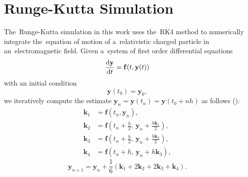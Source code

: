 	\section{Runge-Kutta Simulation}
	\label{sec:rks}
		The~Runge-Kutta simulation in this work uses the~\ac{RK4} method to numerically integrate the~equation of motion of a~relativistic charged particle in an~electromagnetic field. Given a~system of first order differential equations
			\begin{equation}
				\derivative{\mathbf{y}}{t}(t) = \mathbf{f}(t,\mathbf{y}(t))
			\end{equation}
		with an initial condition
			\begin{equation}
				\mathbf{y}(t_0) = \mathbf{y}_0,
			\end{equation}
		we iteratively compute the estimate $\mathbf{y}_n = \mathbf{y}(t_n) = \mathbf{y}(t_0+nh)$ as follows ():
			\begin{align}
				\mathbf{k}_1 &= \mathbf{f}(t_n,\mathbf{y}_n),\\
				\mathbf{k}_2 &= \mathbf{f}\left(t_n+\frac{h}{2},\, \mathbf{y}_n+\frac{h\mathbf{k}_1}{2}\right),\\
				\mathbf{k}_3 &= \mathbf{f}\left(t_n+\frac{h}{2},\, \mathbf{y}_n+\frac{h\mathbf{k}_2}{2}\right),\\
				\mathbf{k}_4 &= \mathbf{f}(t_n+h,\, \mathbf{y}_n+h\mathbf{k}_3),
			\end{align}
			\begin{equation}
				\mathbf{y}_{n+1} = \mathbf{y}_n + \frac{1}{6}(\mathbf{k}_1+2\mathbf{k}_2+2\mathbf{k}_3+\mathbf{k}_4).
			\end{equation}
		
